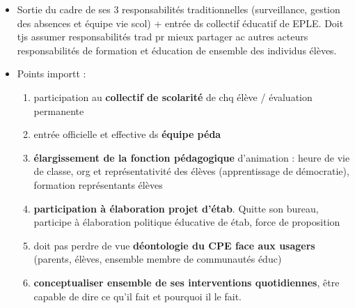 \documentclass[12pt]{report}
\begin{document}
\begin{itemize}
\begin{enumerate}
\end{enumerate}

\item Sortie du cadre de ses 3 responsabilités traditionnelles (surveillance, gestion des absences et équipe vie scol) + entrée ds collectif éducatif de EPLE. Doit tjs assumer responsabilités trad pr mieux partager ac autres acteurs responsabilités de formation et éducation de ensemble des individus élèves. \\

\item Points importt : 
\begin{enumerate}
\item participation au \textbf{collectif de scolarité} de chq élève / évaluation permanente \\
\item entrée officielle et effective ds \textbf{équipe péda} \\
\item \textbf{ élargissement de la fonction pédagogique} d'animation  : heure de vie de classe, org et représentativité des élèves (apprentissage de démocratie), formation représentants élèves \\
\item \textbf{participation à élaboration projet d'étab}. Quitte son bureau, participe à élaboration politique éducative de étab, force de proposition \\
\item doit pas perdre de vue \textbf{déontologie du CPE face aux usagers} (parents, élèves, ensemble membre de communautés éduc) \\
\item \textbf{conceptualiser ensemble de ses interventions quotidiennes}, être capable de dire ce qu'il fait et pourquoi il le fait. \\

\end{enumerate}

\end{itemize}
\end{document}
